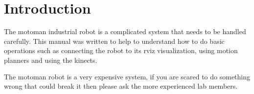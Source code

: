 \section{Introduction}

The motoman industrial robot is a complicated system that needs to be handled carefully. This manual was written to help to understand how to do basic operations such as connecting the robot to its rviz visualization, using motion planners and using the kinects.

The motoman robot is a very expensive system, if you are scared to do something wrong that could break it then please ask the more experienced lab members.